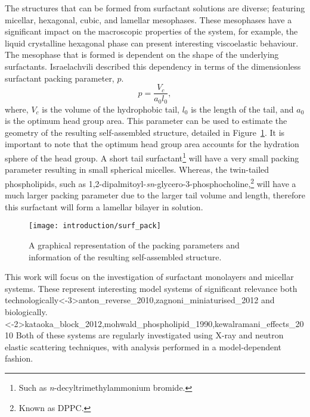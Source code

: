 The structures that can be formed from surfactant solutions are diverse; featuring micellar, hexagonal, cubic, and lamellar mesophases.
These mesophases have a significant impact on the macroscopic properties of the system, for example, the liquid crystalline hexagonal phase can present interesting viscoelastic behaviour.\autocite{jurasin_lamellar_2013,cordobes_linear_1997}
The mesophase that is formed is dependent on the shape of the underlying surfactants.
Israelachvili described this dependency in terms of the dimensionless surfactant packing parameter, $p$.\autocite{israelachvili_intermolecular_2011}
%
\begin{equation}
p = \frac{V_c}{a_0l_0},
\end{equation}
%
where, $V_c$ is the volume of the hydrophobic tail, $l_0$ is the length of the tail, and $a_0$ is the optimum head group area.
This parameter can be used to estimate the geometry of the resulting self-assembled structure, detailed in Figure~\ref{fig:pack}.
It is important to note that the optimum head group area accounts for the hydration sphere of the head group.
A short tail surfactant\footnote{Such as \emph{n}-decyltrimethylammonium bromide.} will have a very small packing parameter resulting in small spherical micelles.
Whereas, the twin-tailed phospholipids, such as 1,2-dipalmitoyl-\emph{sn}-glycero-3-phosphocholine,\footnote{Known as DPPC.} will have a much larger packing parameter due to the larger tail volume and length, therefore this surfactant will form a lamellar bilayer in solution.
%
\begin{figure}[t]
    \centering
    \texttt{[image: introduction/surf\_pack]}
    \caption{A graphical representation of the packing parameters and information of the resulting self-assembled structure.}
    \label{fig:pack}
\end{figure}
%

This work will focus on the investigation of surfactant monolayers and micellar systems.
These represent interesting model systems of significant relevance both technologically\sidecite<-3\baselineskip>{anton_reverse_2010,zagnoni_miniaturised_2012} and biologically.\sidecite<-2\baselineskip>{kataoka_block_2012,mohwald_phospholipid_1990,kewalramani_effects_2010}
Both of these systems are regularly investigated using X-ray and neutron elastic scattering techniques, with analysis performed in a model-dependent fashion.\autocite{pambou_structural_2015,hayward_liquid_2015,rodriguez-loureiro_neutron_2017,hazell_langmuir_2016}
